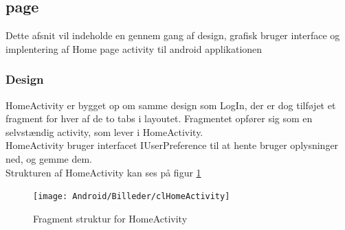 \subsection{\Home page}
	Dette afsnit vil indeholde en gennem gang af design, grafisk bruger interface og implentering af Home page activity til android applikationen
	\subsubsection{Design}
	HomeActivity er bygget op om samme design som LogIn, der er dog tilføjet et fragment for hver af de to tabs i layoutet. Fragmentet opfører sig som en selvstændig activity, som lever i HomeActivity. \\
	HomeActivity bruger interfacet IUserPreference til at hente bruger oplysninger ned, og gemme dem.\\
	Strukturen af HomeActivity kan ses på figur \ref{fig:Klasse diagram for HomeActivity}
	\begin{figure}[h!]
		\begin{center}
			\texttt{[image: Android/Billeder/clHomeActivity]}
		\end{center}
		\caption{Fragment struktur for HomeActivity}
		\label{fig:Klasse diagram for HomeActivity}
	\end{figure}
	\pagebreak
	
